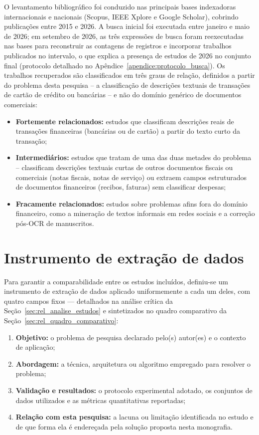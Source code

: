 O levantamento bibliográfico foi conduzido nas principais bases indexadoras internacionais e nacionais (Scopus, IEEE Xplore e Google Scholar), cobrindo publicações entre 2015 e 2026. A busca inicial foi executada entre janeiro e maio de 2026; em setembro de 2026, as três expressões de busca foram reexecutadas nas bases para reconstruir as contagens de registros e incorporar trabalhos publicados no intervalo, o que explica a presença de estudos de 2026 no conjunto final (protocolo detalhado no Apêndice~\ref{apendice:protocolo_busca}). Os trabalhos recuperados são classificados em três graus de relação, definidos a partir do problema desta pesquisa -- a classificação de descrições textuais de transações de cartão de crédito ou bancárias -- e não do domínio genérico de documentos comerciais:
\begin{itemize}
	\item \textbf{Fortemente relacionados:} estudos que classificam descrições reais de transações financeiras (bancárias ou de cartão) a partir do texto curto da transação;
	\item \textbf{Intermediários:} estudos que tratam de uma das duas metades do problema -- classificam descrições textuais curtas de outros documentos fiscais ou comerciais (notas fiscais, notas de serviço) ou extraem campos estruturados de documentos financeiros (recibos, faturas) sem classificar despesas;
	\item \textbf{Fracamente relacionados:} estudos sobre problemas afins fora do domínio financeiro, como a mineração de textos informais em redes sociais e a correção pós-OCR de manuscritos.
\end{itemize}

\section{Instrumento de extração de dados}
\label{sec:rel_instrumento}

Para garantir a comparabilidade entre os estudos incluídos, definiu-se um instrumento de extração de dados aplicado uniformemente a cada um deles, com quatro campos fixos --- detalhados na análise crítica da Seção~\ref{sec:rel_analise_estudos} e sintetizados no quadro comparativo da Seção~\ref{sec:rel_quadro_comparativo}:
\begin{enumerate}
	\item \textbf{Objetivo:} o problema de pesquisa declarado pelo(s) autor(es) e o contexto de aplicação;
	\item \textbf{Abordagem:} a técnica, arquitetura ou algoritmo empregado para resolver o problema;
	\item \textbf{Validação e resultados:} o protocolo experimental adotado, os conjuntos de dados utilizados e as métricas quantitativas reportadas;
	\item \textbf{Relação com esta pesquisa:} a lacuna ou limitação identificada no estudo e de que forma ela é endereçada pela solução proposta nesta monografia.
\end{enumerate}

